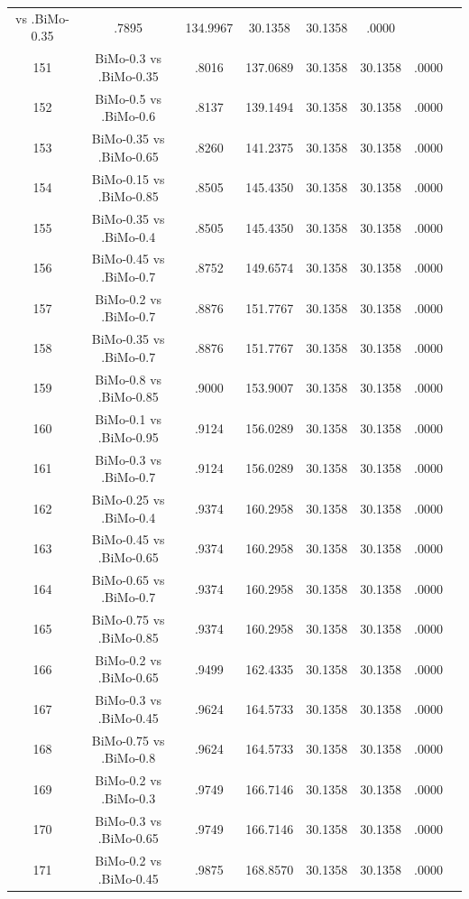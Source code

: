 \documentclass[a4paper,10pt]{article}
\begin{document}
\begin{landscape}
\begin{table}[!htp]
\begin{tabular}{cccccccc}
vs .BiMo-0.35&.7895&134.9967&30.1358&30.1358&.0000\\151&BiMo-0.3 vs .BiMo-0.35&.8016&137.0689&30.1358&30.1358&.0000\\152&BiMo-0.5 vs .BiMo-0.6&.8137&139.1494&30.1358&30.1358&.0000\\153&BiMo-0.35 vs .BiMo-0.65&.8260&141.2375&30.1358&30.1358&.0000\\154&BiMo-0.15 vs .BiMo-0.85&.8505&145.4350&30.1358&30.1358&.0000\\155&BiMo-0.35 vs .BiMo-0.4&.8505&145.4350&30.1358&30.1358&.0000\\156&BiMo-0.45 vs .BiMo-0.7&.8752&149.6574&30.1358&30.1358&.0000\\157&BiMo-0.2 vs .BiMo-0.7&.8876&151.7767&30.1358&30.1358&.0000\\158&BiMo-0.35 vs .BiMo-0.7&.8876&151.7767&30.1358&30.1358&.0000\\159&BiMo-0.8 vs .BiMo-0.85&.9000&153.9007&30.1358&30.1358&.0000\\160&BiMo-0.1 vs .BiMo-0.95&.9124&156.0289&30.1358&30.1358&.0000\\161&BiMo-0.3 vs .BiMo-0.7&.9124&156.0289&30.1358&30.1358&.0000\\162&BiMo-0.25 vs .BiMo-0.4&.9374&160.2958&30.1358&30.1358&.0000\\163&BiMo-0.45 vs .BiMo-0.65&.9374&160.2958&30.1358&30.1358&.0000\\164&BiMo-0.65 vs .BiMo-0.7&.9374&160.2958&30.1358&30.1358&.0000\\165&BiMo-0.75 vs .BiMo-0.85&.9374&160.2958&30.1358&30.1358&.0000\\166&BiMo-0.2 vs .BiMo-0.65&.9499&162.4335&30.1358&30.1358&.0000\\167&BiMo-0.3 vs .BiMo-0.45&.9624&164.5733&30.1358&30.1358&.0000\\168&BiMo-0.75 vs .BiMo-0.8&.9624&164.5733&30.1358&30.1358&.0000\\169&BiMo-0.2 vs .BiMo-0.3&.9749&166.7146&30.1358&30.1358&.0000\\170&BiMo-0.3 vs .BiMo-0.65&.9749&166.7146&30.1358&30.1358&.0000\\171&BiMo-0.2 vs .BiMo-0.45&.9875&168.8570&30.1358&30.1358&.0000\\\hline
\end{tabular}
\end{table}

\end{landscape}
\end{document}
